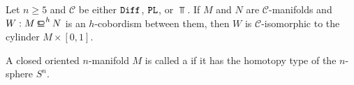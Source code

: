 \begin{theorem}[$h$-cobordism]\label{thm:h-cobordism}
  Let $n\geq 5$ and $\mathscr{C}$ be either $\mathtt{Diff}$, $\mathtt{PL}$, or $\Top$. If $M$ and $N$ are $\mathscr{C}$-manifolds and $W : M \hbord N$ is an $h$-cobordism between them, then $W$ is $\mathscr{C}$-isomorphic to the cylinder $M\times [0,1]$.
\end{theorem}

\begin{definition}
  A closed oriented $n$-manifold $M$ is called a  if it has the homotopy type of the $n$-sphere $S^n$.
\end{definition}
